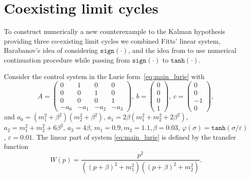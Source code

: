 \documentclass{ifacconf}
\theoremstyle{plain}
\begin{document}
\section{Coexisting limit cycles}

To construct numerically a new counterexample to the Kalman hypothesis
providing three co-existing limit cycles
we combined Fitts' linear system,
Barabanov's idea of considering $\texttt{sign}(\cdot)$,
and the idea from \citep{LeonovK-2011-DAN} to use numerical continuation procedure
while passing from $\texttt{sign}(\cdot)$ to $\texttt{tanh}(\cdot)$.

Consider the control system in the Lurie form~\eqref{eq:main_lurie}
with
\begin{equation}\label{eq:main:matricies}
  A\!=\!\left(
  \begin{array}{cccc}
    0 & 1 & 0 & 0 \\
    0 & 0 & 1 & 0 \\
    0 & 0 & 0 & 1  \\
    -a_0 & -a_1 & -a_2 & -a_3
  \end{array}
  \right)\!\!, \
  b = \left(
    \begin{array}{c}
    0 \\ 0 \\ 0 \\ 1
    \end{array}
  \right)\!\!, \
  c = \left(
    \begin{array}{c}
    0 \\ 0 \\ -1 \\ 0
    \end{array}
  \right)\!\!,
\end{equation}
and $a_0 = (m_1^2+\beta^2)(m_2^2+\beta^2)$,
$a_1 = 2 \beta (m_1^2 + m_2^2 + 2 \beta^2)$,
$a_2 = m_1^2 + m_2^2 + 6 \beta^2$, $a_3 = 4 \beta$, $m_1 = 0.9, m_2 = 1.1,
\beta = 0.03$, $\varphi(\sigma) = \texttt{tanh}(\sigma / \varepsilon)$,
$\varepsilon = 0.01$.
The linear part of system \eqref{eq:main_lurie} is defined by the transfer function
\begin{equation}\label{eq:trFuncFitts}
  W(p) = \frac{p^2}{\left((p+\beta)^2 + m_1^2\right)\left((p+\beta)^2 + m_2^2\right)}.
\end{equation}
\end{document}
